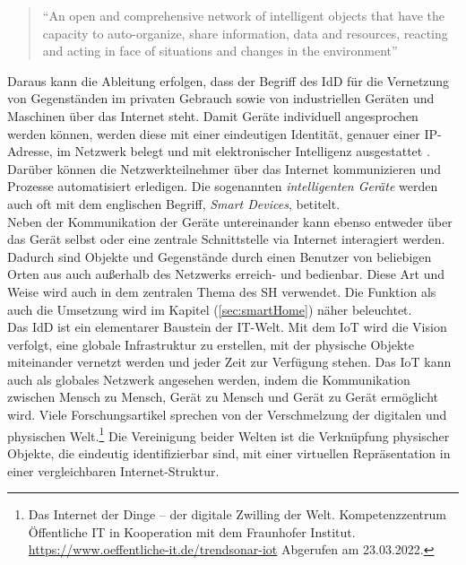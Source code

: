     \pagebreak
    \begin{quote}
        “An open and comprehensive network of intelligent objects that have the capacity to auto-organize, share information, data 
        and resources, reacting and acting in face of situations and changes in the environment” \cite{Madakam2015}
    \end{quote}
    Daraus kann die Ableitung erfolgen, dass der Begriff des \acl{IdD} für die Vernetzung von Gegenständen im privaten Gebrauch sowie 
    von industriellen Geräten und Maschinen über das Internet steht. Damit Geräte individuell angesprochen werden können, werden diese 
    mit einer eindeutigen Identität, genauer einer \ac{IP}-Adresse, im Netzwerk belegt und mit elektronischer Intelligenz ausgestattet \cite{bigdatainsider2016}.
    Darüber können die Netzwerkteilnehmer über das Internet kommunizieren und Prozesse automatisiert erledigen. Die sogenannten 
    \textit{intelligenten Geräte} werden auch oft mit dem englischen Begriff, \textit{Smart Devices}, betitelt. 
    \\
    \linebreak
    Neben der Kommunikation der Geräte untereinander kann ebenso entweder über das Gerät selbst oder eine zentrale 
    Schnittstelle via Internet interagiert werden. Dadurch sind Objekte und Gegenstände durch einen Benutzer von beliebigen Orten aus  
    auch außerhalb des Netzwerks erreich- und bedienbar. Diese Art und Weise wird auch in dem zentralen Thema des 
    \acl{SH} verwendet. Die Funktion als auch die Umsetzung wird im Kapitel (\ref{sec:smartHome}) näher beleuchtet.
    \\
    \linebreak
    Das \acl{IdD} ist ein elementarer Baustein der \acs{IT}-Welt. Mit dem \acs{IoT} wird die Vision verfolgt, eine globale 
    Infrastruktur zu erstellen, mit der physische Objekte miteinander vernetzt werden und jeder Zeit zur Verfügung stehen. Das \acl{IoT} 
    kann auch als globales Netzwerk angesehen werden, indem die Kommunikation zwischen Mensch zu Mensch, Gerät zu Mensch und Gerät zu 
    Gerät ermöglicht wird. Viele Forschungsartikel sprechen von der Verschmelzung der digitalen und 
    physischen Welt.\footnote{Das Internet der Dinge – der digitale Zwilling der Welt. Kompetenzzentrum Öffentliche IT in Kooperation mit dem Fraunhofer Institut. \url{https://www.oeffentliche-it.de/trendsonar-iot} Abgerufen am 23.03.2022.} 
    Die Vereinigung beider Welten ist die Verknüpfung physischer Objekte, die eindeutig identifizierbar sind, mit einer virtuellen 
    Repräsentation in einer vergleichbaren Internet-Struktur. 
